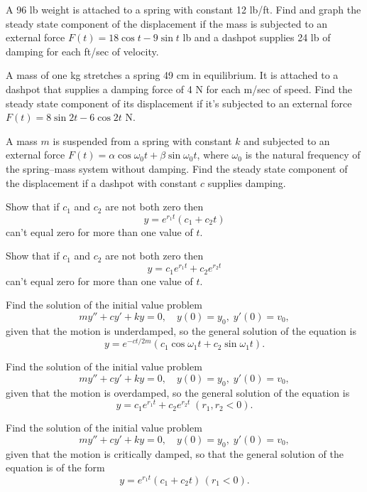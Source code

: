 \documentclass{ximera}
\begin{document}
\begin{problem}\label{exer:6.2.19}  
A 96 lb weight is attached to a spring with constant 12 lb/ft. Find
and graph the steady state component of the displacement if the mass is
subjected to an external force $F(t)=18\cos t-9\sin t$ lb and a
dashpot supplies 24 lb of damping for each ft/sec of velocity.
\end{problem}

\begin{problem}\label{exer:6.2.20}
A mass of one kg stretches a spring 49 cm in equilibrium. It is
attached to a dashpot that supplies a damping force of 4 N for each
m/sec of speed. Find the steady state component of its displacement if
it's subjected to an external force $F(t)=8\sin2t-6\cos2t$ N.
\end{problem}

\begin{problem}\label{exer:6.2.21}
A mass $m$ is suspended from a spring with constant $k$ and subjected to an
external force $F(t)=\alpha\cos\omega_0t+\beta\sin\omega_0t$, where
$\omega_0$ is the natural frequency of the spring--mass system without
damping. Find the steady state component of the displacement if a dashpot
with constant $c$ supplies damping.
\end{problem}

\begin{problem}\label{exer:6.2.22}
Show that if $c_1$ and $c_2$ are not both zero then
$$
y=e^{r_1t}(c_1+c_2t)
$$
can't equal zero for more than one value of
$t$.
\end{problem}

\begin{problem}\label{exer:6.2.23}
Show that if $c_1$ and $c_2$ are not both zero then
$$
y=c_1e^{r_1t}+c_2e^{r_2t}
$$
 can't equal zero for more than one
value of $t$.
\end{problem}

\begin{problem}\label{exer:6.2.24}
Find the solution of the initial value problem
$$
my''+cy'+ky=0,\quad y(0)=y_0,\;y'(0)=v_0,
$$
given that the motion is underdamped, so  the general solution of
the equation is
$$
y=e^{-ct/2m}(c_1\cos\omega_1t+c_2\sin\omega_1t).
$$
\end{problem}

\begin{problem}\label{exer:6.2.25}
Find the solution of the initial value problem
$$
my''+cy'+ky=0,\quad y(0)=y_0,\;y'(0)=v_0,
$$
given that the motion is overdamped, so  the general solution of
the equation is
$$
y=c_1e^{r_1t}+c_2e^{r_2t}\;(r_1,r_2<0).
$$
\end{problem}

\begin{problem}\label{exer:6.2.26}
Find the solution of the initial value problem
$$
my''+cy'+ky=0,\quad y(0)=y_0,\;y'(0)=v_0,
$$
given that the motion is critically damped, so that the general
solution of the equation is of the form
$$
y=e^{r_1t}(c_1+c_2t)\,(r_1<0).
$$
\end{problem}
\end{document}
